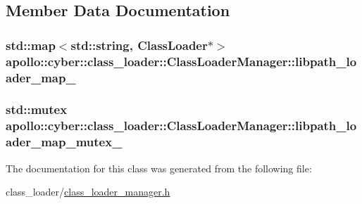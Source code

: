 \subsection{Member Data Documentation}
\hypertarget{classapollo_1_1cyber_1_1class__loader_1_1ClassLoaderManager_a22bbb1ede2aa1ebe5e80650df9bdba7f}{
\subsubsection[{libpath\-\_\-loader\-\_\-map\-\_\-}]{\setlength{\rightskip}{0pt plus 5cm}std\-::map$<$std\-::string, {\bf Class\-Loader}$\ast$$>$ apollo\-::cyber\-::class\-\_\-loader\-::\-Class\-Loader\-Manager\-::libpath\-\_\-loader\-\_\-map\-\_\-\hspace{0.3cm}{\ttfamily [private]}}}\label{classapollo_1_1cyber_1_1class__loader_1_1ClassLoaderManager_a22bbb1ede2aa1ebe5e80650df9bdba7f}
\hypertarget{classapollo_1_1cyber_1_1class__loader_1_1ClassLoaderManager_a994b015a75ed982747df24c95fbae762}{
\subsubsection[{libpath\-\_\-loader\-\_\-map\-\_\-mutex\-\_\-}]{\setlength{\rightskip}{0pt plus 5cm}std\-::mutex apollo\-::cyber\-::class\-\_\-loader\-::\-Class\-Loader\-Manager\-::libpath\-\_\-loader\-\_\-map\-\_\-mutex\-\_\-\hspace{0.3cm}{\ttfamily [private]}}}\label{classapollo_1_1cyber_1_1class__loader_1_1ClassLoaderManager_a994b015a75ed982747df24c95fbae762}


The documentation for this class was generated from the following file\-:\begin{DoxyCompactItemize}
\item 
class\-\_\-loader/\hyperlink{class__loader__manager_8h}{class\-\_\-loader\-\_\-manager.\-h}\end{DoxyCompactItemize}
